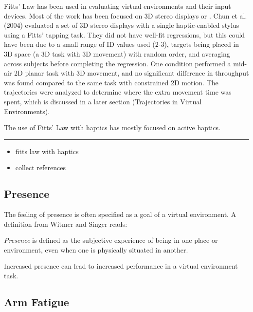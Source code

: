 Fitts' Law has been used in evaluating virtual environments and their input devices.
Most of the work has been focused on 3D stereo displays\cite{liu_comparing_2009} or .
Chun et al. (2004) evaluated a set of 3D stereo displays with a single haptic-enabled stylus using a Fitts’ tapping task.
They did not have well-fit regressions, but this could have been due to a small range of ID values used (2-3), targets being placed in 3D space (a 3D task with 3D movement) with random order, and averaging across subjects before completing the regression.
One condition performed a mid-air 2D planar task with 3D movement, and no significant difference in throughput was found compared to the same task with constrained 2D motion.
The trajectories were analyzed to determine where the extra movement time was spent, which is discussed in a later section (Trajectories in Virtual Environments).

The use of Fitts' Law with haptics has mostly focused on active haptics\cite{chun_evaluating_2004}.
\rule{0.75\textwidth}{1pt}
\begin{itemize}
  \item fitts law with haptics
  \item collect references
\end{itemize}

\subsection{Presence}

The feeling of presence is often specified as a goal of a virtual environment.
A definition from Witmer and Singer\cite{witmer_measuring_1998} reads:
\begin{displayquote}
\textit{Presence} is defined as the subjective experience of being in one place or environment, even when one is physically situated in another.
\end{displayquote}
Increased presence can lead to increased performance in a virtual environment task\cite{youngblut_relationship_2003}.

\subsection{Arm Fatigue}

